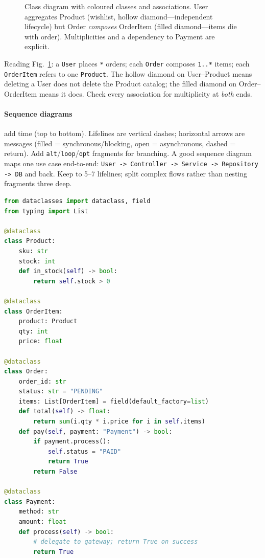 \begin{figure}[h]
\caption{Class diagram with coloured classes and associations. User aggregates Product (wishlist, hollow diamond---independent lifecycle) but Order \emph{composes} OrderItem (filled diamond---items die with order). Multiplicities and a dependency to Payment are explicit.}
\label{fig:class-associations}
\end{figure}

Reading Fig.~\ref{fig:class-associations}: a \texttt{User} places \texttt{*} orders; each \texttt{Order} composes \texttt{1..*} items; each \texttt{OrderItem} refers to one \texttt{Product}. The hollow diamond on User--Product means deleting a User does not delete the Product catalog; the filled diamond on Order--OrderItem means it does. Check every association for multiplicity at \emph{both} ends.

\paragraph{Sequence diagrams} add time (top to bottom). Lifelines are vertical dashes; horizontal arrows are messages (filled = synchronous/blocking, open = asynchronous, dashed = return). Add \texttt{alt}/\texttt{loop}/\texttt{opt} fragments for branching. A good sequence diagram maps one use case end-to-end: \texttt{User -> Controller -> Service -> Repository -> DB} and back. Keep to 5--7 lifelines; split complex flows rather than nesting fragments three deep.

\begin{lstlisting}[language=Python, caption={Python skeleton generated from the class diagram. Note types, composition, and delegation.}]
from dataclasses import dataclass, field
from typing import List

@dataclass
class Product:
    sku: str
    stock: int
    def in_stock(self) -> bool:
        return self.stock > 0

@dataclass
class OrderItem:
    product: Product
    qty: int
    price: float

@dataclass
class Order:
    order_id: str
    status: str = "PENDING"
    items: List[OrderItem] = field(default_factory=list)
    def total(self) -> float:
        return sum(i.qty * i.price for i in self.items)
    def pay(self, payment: "Payment") -> bool:
        if payment.process():
            self.status = "PAID"
            return True
        return False

@dataclass
class Payment:
    method: str
    amount: float
    def process(self) -> bool:
        # delegate to gateway; return True on success
        return True
\end{lstlisting}

